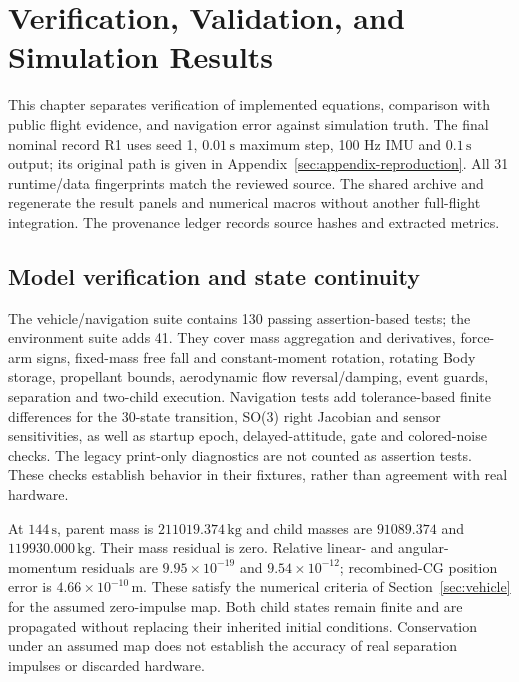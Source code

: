 \section{Verification, Validation, and Simulation Results}
\label{sec:results}

This chapter separates verification of implemented equations, comparison with public flight evidence, and navigation error against simulation truth. The final nominal record R1 uses seed 1, $0.01\,\mathrm{s}$ maximum step, 100 Hz IMU and $0.1\,\mathrm{s}$ output; its original path is given in Appendix~\ref{sec:appendix-reproduction}. All 31 runtime/data fingerprints match the reviewed source. The shared archive and  regenerate the result panels and numerical macros without another full-flight integration. The provenance ledger  records source hashes and extracted metrics.

\subsection{Model verification and state continuity}
The vehicle/navigation suite contains 130 passing assertion-based tests; the environment suite adds 41. They cover mass aggregation and derivatives, force-arm signs, fixed-mass free fall and constant-moment rotation, rotating Body storage, propellant bounds, aerodynamic flow reversal/damping, event guards, separation and two-child execution. Navigation tests add tolerance-based finite differences for the 30-state transition, SO(3) right Jacobian and sensor sensitivities, as well as startup epoch, delayed-attitude, gate and colored-noise checks. The legacy print-only diagnostics are not counted as assertion tests. These checks establish behavior in their fixtures, rather than agreement with real hardware.

At $144\,\mathrm{s}$, parent mass is $211019.374\,\mathrm{kg}$ and child masses are $91089.374$ and $119930.000\,\mathrm{kg}$. Their mass residual is zero. Relative linear- and angular-momentum residuals are $9.95\times10^{-19}$ and $9.54\times10^{-12}$; recombined-CG position error is $4.66\times10^{-10}\,\mathrm{m}$. These satisfy the numerical criteria of Section~\ref{sec:vehicle} for the assumed zero-impulse map. Both child states remain finite and are propagated without replacing their inherited initial conditions. Conservation under an assumed map does not establish the accuracy of real separation impulses or discarded hardware.

